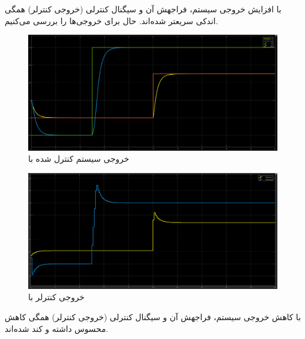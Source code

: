 \documentclass[14pt, a4paper]{extarticle}
\begin{document}
با افزایش 
خروجی سیستم، فراجهش آن و سیگنال کنترلی (خروجی کنترلر) همگی اندکی سریعتر شده‌اند.
\newpage
حال برای 
خروجی‌ها را بررسی می‌کنیم.\\
\begin{figure}[h!]
	\centering
	\includegraphics[scale = 0.3]{Q2_sim_result_ch1.png}
	\caption{خروجی سیستم کنترل شده با
		}
\end{figure}
\begin{figure}[h!]
	\centering
	\includegraphics[scale = 0.3]{Q2_sim_control_ch1.png}
	\caption{خروجی کنترلر با
		}
\end{figure}

با کاهش 
خروجی سیستم، فراجهش آن و سیگنال کنترلی (خروجی کنترلر) همگی کاهش محسوس داشته و کند شده‌اند.

\newpage
\end{document}
